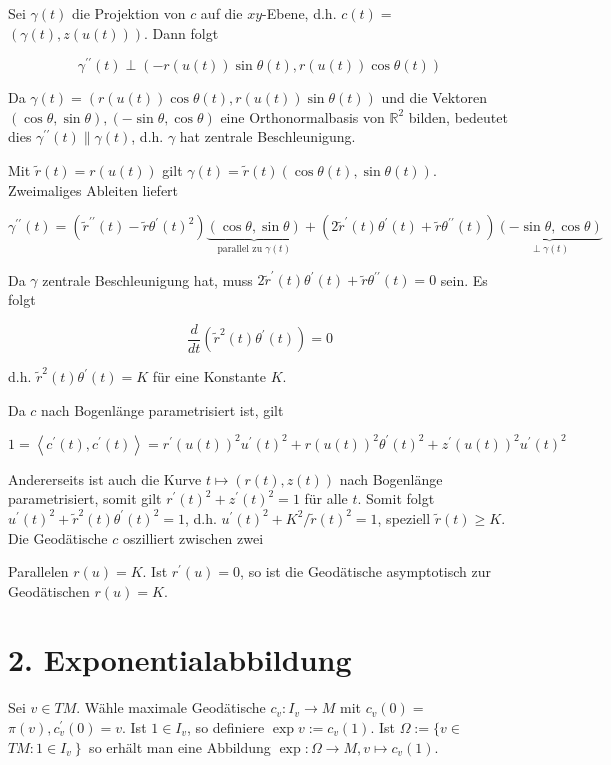 \documentclass[10pt]{article}
\begin{document}
Sei $\gamma(t)$ die Projektion von $c$ auf die $x y$-Ebene, d.h. $c(t)=$ $(\gamma(t), z(u(t)))$. Dann folgt

$$
\gamma^{\prime \prime}(t) \perp(-r(u(t)) \sin \theta(t), r(u(t)) \cos \theta(t))
$$

Da $\gamma(t)=(r(u(t)) \cos \theta(t), r(u(t)) \sin \theta(t))$ und die Vektoren $(\cos \theta, \sin \theta),(-\sin \theta, \cos \theta)$ eine Orthonormalbasis von $\mathbb{R}^{2}$ bilden, bedeutet dies $\gamma^{\prime \prime}(t) \| \gamma(t)$, d.h. $\gamma$ hat zentrale Beschleunigung.

Mit $\tilde{r}(t)=r(u(t))$ gilt $\gamma(t)=\tilde{r}(t)(\cos \theta(t), \sin \theta(t))$. Zweimaliges Ableiten liefert

$$
\gamma^{\prime \prime}(t)=\left(\tilde{r}^{\prime \prime}(t)-\tilde{r} \theta^{\prime}(t)^{2}\right) \underbrace{(\cos \theta, \sin \theta)}_{\text {parallel zu } \gamma(t)}+\left(2 \tilde{r}^{\prime}(t) \theta^{\prime}(t)+\tilde{r} \theta^{\prime \prime}(t)\right) \underbrace{(-\sin \theta, \cos \theta)}_{\perp \gamma(t)}
$$

Da $\gamma$ zentrale Beschleunigung hat, muss $2 \tilde{r}^{\prime}(t) \theta^{\prime}(t)+\tilde{r} \theta^{\prime \prime}(t)=0$ sein. Es folgt

$$
\frac{d}{d t}\left(\tilde{r}^{2}(t) \theta^{\prime}(t)\right)=0
$$

d.h. $\tilde{r}^{2}(t) \theta^{\prime}(t)=K$ für eine Konstante $K$.

Da $c$ nach Bogenlänge parametrisiert ist, gilt

$$
1=\left\langle c^{\prime}(t), c^{\prime}(t)\right\rangle=r^{\prime}(u(t))^{2} u^{\prime}(t)^{2}+r(u(t))^{2} \theta^{\prime}(t)^{2}+z^{\prime}(u(t))^{2} u^{\prime}(t)^{2}
$$

Andererseits ist auch die Kurve $t \mapsto(r(t), z(t))$ nach Bogenlänge parametrisiert, somit gilt $r^{\prime}(t)^{2}+z^{\prime}(t)^{2}=1$ für alle $t$. Somit folgt $u^{\prime}(t)^{2}+\tilde{r}^{2}(t) \theta^{\prime}(t)^{2}=1$, d.h. $u^{\prime}(t)^{2}+K^{2} / \tilde{r}(t)^{2}=1$, speziell $\tilde{r}(t) \geq K$. Die Geodätische $c$ oszilliert zwischen zwei

Parallelen $r(u)=K$. Ist $r^{\prime}(u)=0$, so ist die Geodätische asymptotisch zur Geodätischen $r(u)=K$.

\section*{2. Exponentialabbildung}
Sei $v \in T M$. Wähle maximale Geodätische $c_{v}: I_{v} \rightarrow M$ mit $c_{v}(0)=$ $\pi(v), c_{v}^{\prime}(0)=v$. Ist $1 \in I_{v}$, so definiere $\exp v:=c_{v}(1)$. Ist $\Omega:=\{v \in$ $\left.T M: 1 \in I_{v}\right\}$ so erhält man eine Abbildung $\exp : \Omega \rightarrow M, v \mapsto c_{v}(1)$.
\end{document}
